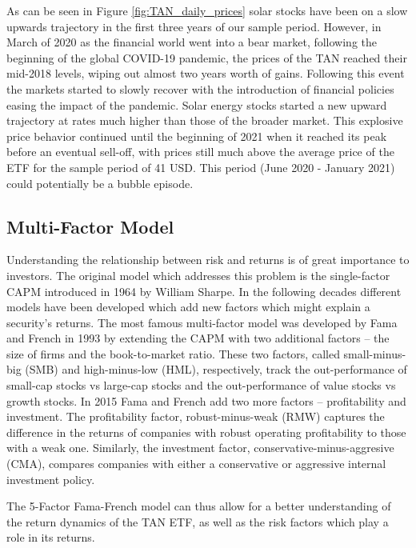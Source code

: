 \documentclass[11pt]{article}
\begin{document}
As can be seen in Figure \ref{fig:TAN_daily_prices} solar stocks have been on a slow upwards trajectory in the first three years of our sample period. However, in March of 2020 as the financial world went into a bear market, following the beginning of the global COVID-19 pandemic, the prices of the TAN reached their mid-2018 levels, wiping out almost two years worth of gains. Following this event the markets started to slowly recover with the introduction of financial policies easing the impact of the pandemic. Solar energy stocks started a new upward trajectory at rates much higher than those of the broader market. This explosive price behavior continued until the beginning of 2021 when it reached its peak before an eventual sell-off, with prices still much above the average price of the ETF for the sample period of 41 USD. This period (June 2020 - January 2021) could potentially be a bubble episode.

\subsection{Multi-Factor Model}

Understanding the relationship between risk and returns is of great importance to investors. The original model which addresses this problem is the single-factor CAPM introduced in 1964 by William Sharpe. In the following decades different models have been developed which add new factors which might explain a security's returns. The most famous multi-factor model was developed by Fama and French in 1993 by extending the CAPM with two additional factors -- the size of firms and the book-to-market ratio. These two factors, called small-minus-big (SMB) and high-minus-low (HML), respectively, track the out-performance of small-cap stocks vs large-cap stocks and the out-performance of value stocks vs growth stocks. In 2015 Fama and French add two more factors -- profitability and investment. The profitability factor, robust-minus-weak (RMW) captures the difference in the returns of companies with robust operating profitability to those with a weak one. Similarly, the investment factor, conservative-minus-aggresive (CMA), compares companies with either a conservative or aggressive internal investment policy. 
\newline

The 5-Factor Fama-French model can thus allow for a better understanding of the return dynamics of the TAN ETF, as well as the risk factors which play a role in its returns. 
\newpage
\end{document}
